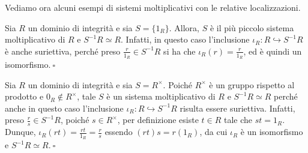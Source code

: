 \noindent Vediamo ora alcuni esempi di sistemi moltiplicativi con le relative localizzazioni.

\begin{exm}Sia $R$ un dominio di integrità e sia $S=\{1_R\}$. Allora, $S$ è il più piccolo sistema moltiplicativo di $R$ e $S^{-1}R\simeq R$. Infatti, in questo caso l'inclusione $\iota_R\colon R\hookrightarrow S^{-1}R$ è anche suriettiva, perché preso $\frac{r}{1_R}\in S^{-1}R$ si ha che $\iota_R(r)=\frac{r}{1_R}$, ed è quindi un isomorfismo$. \ \square$\end{exm}

\begin{exm}Sia $R$ un dominio di integrità e sia $S=R^{\times}$. Poiché $R^{\times}$ è un gruppo rispetto al prodotto e $0_R\not\in R^{\times}$, tale $S$ è un sistema moltiplicativo di $R$ e $S^{-1}R\simeq R$ perché anche in questo caso l'inclusione $\iota_R\colon R\hookrightarrow S^{-1}R$ risulta essere suriettiva. Infatti, preso $\frac{r}{s}\in S^{-1}R$, poiché $s\in R^{\times}$, per definizione esiste $t\in R$ tale che $st=1_R$. Dunque, $\iota_R(rt)=\frac{rt}{1_R}=\frac{r}{s}$ essendo $(rt)s=r(1_R)$, da cui $\iota_R$ è un isomorfismo e $S^{-1}R\simeq R. \ \square$\end{exm}

